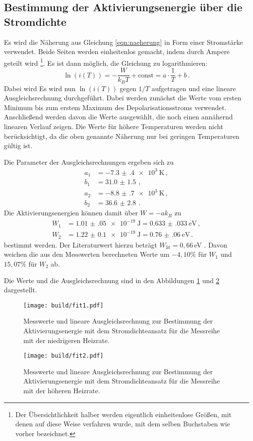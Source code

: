 \newpage
\subsection{Bestimmung der Aktivierungsenergie über die Stromdichte}

Es wird die Näherung aus Gleichung \eqref{eqn:naeherung} in Form einer Stromstärke verwendet. Beide Seiten werden einheitenlos gemacht, indem durch Ampere geteilt wird \footnote{Der Übersichtlichkeit halber werden eigentlich einheitenlose Größen, mit denen auf diese Weise verfahren wurde, mit dem selben Buchstaben wie vorher bezeichnet.}. Es ist dann möglich, die Gleichung zu logarithmieren:
\begin{equation*}
  \ln(i(T))=-\frac{W}{k_B T} + \text{const} =a\cdot \frac{1}{T} +b  \,.
\end{equation*}
Dabei wird
Es wird nun $\ln(i(T))$ gegen $1/T$ aufgetragen und eine lineare Ausgleichsrechnung
durchgeführt. Dabei werden zunächst die Werte vom ersten Minimum bis zum erstem Maximum
des Depolarisationsstroms verwendet. Anschließend werden davon die Werte ausgewählt, die
noch einen annähernd linearen Verlauf zeigen. Die Werte für höhere Temperaturen werden
nicht berücksichtigt, da die oben genannte Näherung nur bei geringen
Temperaturen gültig ist.

Die Parameter
der Ausgleichsrechnungen ergeben sich zu
\begin{align*}
  a_1&=\SI{-7.3(4)e+3}{\kelvin} \,, \\
  b_1&=\SI{31.0(15)}{}  \,, \\
  a_2&=\SI{-8.8(7)e+3}{\kelvin} \,, \\
  b_2&=\SI{36.6(28)}{}  \,.
\end{align*}
Die Aktivierungsenergien können damit über $W=-ak_B$ zu
\begin{align*}
 W_1&=\SI{1.01(05)e-19}{\joule}= \SI{0.633(033)}{\eV}  \,, \\
 W_2&=\SI{1.22(010)e-19}{\joule}=\SI{0.76(06)}{\eV} \,.
\end{align*}
bestimmt werden. Der Literaturwert hierzu beträgt $W_{\text{lit}}=0{,}66\,$eV \cite{lit}. Davon weichen
die aus den Messwerten berechneten Werte um $-4{,}10\%$ für $W_1$ und $15{,}07\%$ für
$W_2$ ab.

Die Werte und die Ausgleichsrechnung sind in den Abbildungen \ref{fig:fit1} und
\ref{fig:fit2} dargestellt.

\begin{figure}
  \centering
  \texttt{[image: build/fit1.pdf]}
  \caption{Messwerte und lineare Ausgleichsrechnung zur Bestimmung der Aktivierungsenergie mit dem Stromdichteansatz für
  die Messreihe mit der niedrigeren Heizrate.}
  \label{fig:fit1}
\end{figure}
\begin{figure}
  \centering
  \texttt{[image: build/fit2.pdf]}
  \caption{Messwerte und lineare Ausgleichsrechnung zur Bestimmung der Aktivierungsenergie mit dem Stromdichteansatz für
  die Messreihe mit der höheren Heizrate.}
  \label{fig:fit2}
\end{figure}

